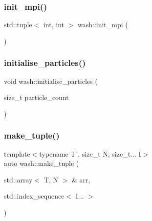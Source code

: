 \mbox{\label{namespacewash_a24c5e20c82921f02f79e9947f7113f70}} 
\subsubsection{\texorpdfstring{init\+\_\+mpi()}{init\_mpi()}}
{\footnotesize\ttfamily std\+::tuple$<$ int, int $>$ wash\+::init\+\_\+mpi (\begin{DoxyParamCaption}{ }\end{DoxyParamCaption})}

\mbox{\label{namespacewash_a0bc7b17c64c2b0f7bdd6c7c2d30f2398}} 
\subsubsection{\texorpdfstring{initialise\+\_\+particles()}{initialise\_particles()}}
{\footnotesize\ttfamily void wash\+::initialise\+\_\+particles (\begin{DoxyParamCaption}\item[{size\+\_\+t}]{particle\+\_\+count }\end{DoxyParamCaption})}

\mbox{\label{namespacewash_ae34701c709b5a3bace6dfc0e19dcf01b}} 
\subsubsection{\texorpdfstring{make\+\_\+tuple()}{make\_tuple()}\hspace{0.1cm}{\footnotesize\ttfamily [1/3]}}
{\footnotesize\ttfamily template$<$typename T , size\+\_\+t N, size\+\_\+t... I$>$ \\
auto wash\+::make\+\_\+tuple (\begin{DoxyParamCaption}\item[{std\+::array$<$ T, N $>$ \&}]{arr,  }\item[{std\+::index\+\_\+sequence$<$ I... $>$}]{ }\end{DoxyParamCaption})}

\mbox{\label{namespacewash_a22d9c927a5c59b8a587e335472411ae7}} 
